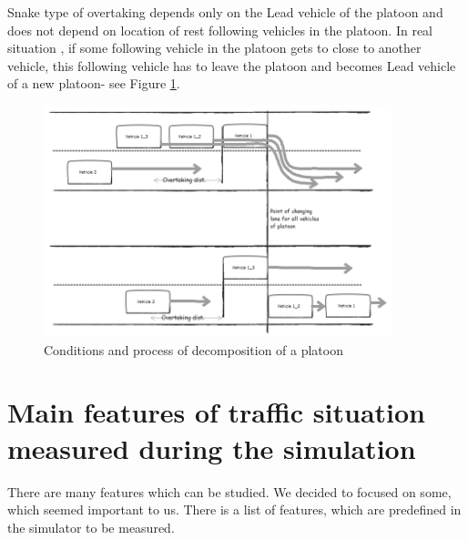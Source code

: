 Snake type of overtaking depends only on the Lead vehicle of the platoon and does not depend on location of rest following vehicles in the platoon. In real situation , if  some following vehicle in the  platoon gets to close to another vehicle, this following  vehicle has to leave the platoon and becomes Lead vehicle of a new platoon- see Figure \ref{fig:4_2_3_3-12}.

\begin{figure}[ph]
\centering
\includegraphics[width=0.90\textwidth,height=0.90\textheight,keepaspectratio]{figures/Chapter_4/4_platoon_decomposition.png}
\centering
\protect\caption{\label{fig:4_2_3_3-12}Conditions and process of decomposition of a platoon}
\end{figure}







\section[Main features of traffic situation measured during the simulation]{Main features of traffic situation measured \newline during the \mbox{simulation}}

There are many features which can be studied. We decided to focused on some, which seemed important to us. There is a list of features, which are predefined in the simulator to be measured.

